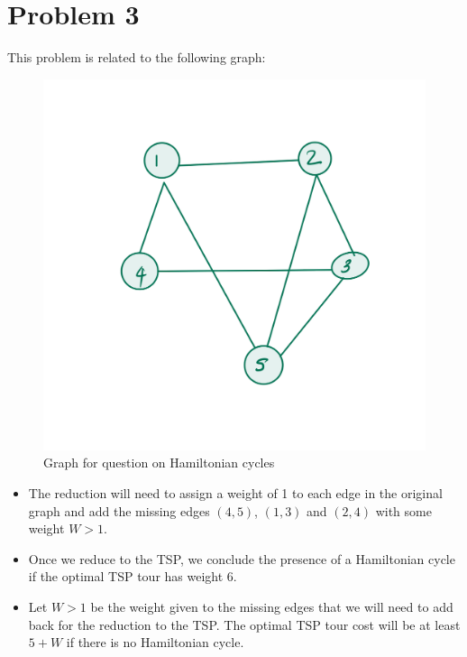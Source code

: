 \documentclass[11pt]{article}
\begin{document}
\section*{Problem 3}
\label{sec:orga3f939b}
This problem is related to the following graph:
\begin{figure}[H]
  \centering
  \includegraphics[scale=0.2]{ham_cycle.jpeg}
  \caption{Graph for question on Hamiltonian cycles}
\end{figure}

\begin{itemize}
\item The reduction will need to assign a weight of 1 to each edge in the original
graph and add the missing edges \((4,5)\), \((1,3)\) and \((2,4)\) with some weight
\(W>1\).
\item Once we reduce to the TSP, we conclude the presence of a Hamiltonian cycle if
the optimal TSP tour has weight 6.
\item Let \(W>1\) be the weight given to the missing edges that we will need to add
back for the reduction to the TSP. The optimal TSP tour cost will be at least
\(5+W\) if there is no Hamiltonian cycle.
\end{itemize}
\end{document}
